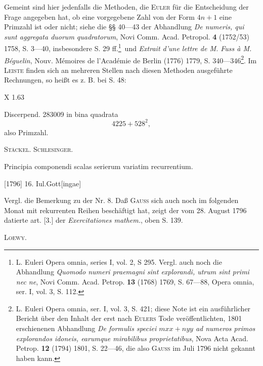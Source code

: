 \medskip\begingroup\small
\indent Gemeint sind hier jedenfalls die Methoden, die \textsc{Euler} für die Entscheidung der Frage angegeben hat, ob eine vorgegebene Zahl von der Form \(4n+1\) eine Primzahl ist oder nicht; siehe die §§ 40—43 der Abhandlung \textit{De numeris, qui sunt aggregata duorum quadratorum}, Novi Comm. Acad. Petropol. \textbf{4} (1752/53) 1758, S. 3—40, insbesondere S. 29 ff.\begingroup\renewcommand{\thefootnote}{**)}\footnote{L. Euleri Opera omnia, series I, vol. 2, S 295. Vergl. auch noch die Abhandlung \textit{Quomodo numeri praemagni sint explorandi, utrum sint primi nec ne}, Novi Comm. Acad. Petrop. \textbf{13} (1768) 1769, S. 67—88, Opera omnia, ser. I, vol. 3, S. 112.}\endgroup\ und \textit{Extrait d’une lettre de M. Fuss à M. Béguelin}, Nouv. Mémoires de l’Académie de Berlin (1776) 1779, S. 340—346\begingroup\renewcommand{\thefootnote}{***)}\footnote{L. Euleri Opera omnia, ser. I, vol. 3, S. 421; diese Note ist ein ausführlicher Bericht über den Inhalt der erst nach \textsc{Eulers} Tode veröffentlichten, 1801 erschienenen Abhandlung \textit{De formulis speciei \(mxx+nyy\) ad numeros primos explorandos idoneis, earumque mirabilibus proprietatibus}, Nova Acta Acad. Petrop. \textbf{12} (1794) 1801, S. 22—46, die also \textsc{Gauss} im Juli 1796 nicht gekannt haben kann.}\endgroup. Im \textsc{Leiste} finden sich an mehreren Stellen nach diesen Methoden ausgeführte Rechnungen, so heißt es z. B. bei S. 48:
\par\endgroup
\par\smallskip\noindent\small X 1.\hfill 63\normalsize

\clearpage{}
\begingroup\small
\indent Discerpend. 283009 in bina quadrata
\[
4225+528^2,
\]
\noindent also Primzahl.
\par\noindent\hfill\textsc{Stäckel. Schlesinger.}
\par\endgroup

\indent Principia componendi scalas serierum variatim recurrentium.
\par\noindent\hfill[1796] 16. Iul.\quad Gott[ingae]

\medskip\begingroup\small
\indent Vergl. die Bemerkung zu der Nr. 8. Daß \textsc{Gauss} sich auch noch im folgenden Monat mit rekurrenten Reihen beschäftigt hat, zeigt der vom 28. August 1796 datierte art. [3.] der \textit{Exercitationes mathem.}, oben S. 139.
\par\noindent\hfill\textsc{Loewy.}
\par\endgroup

